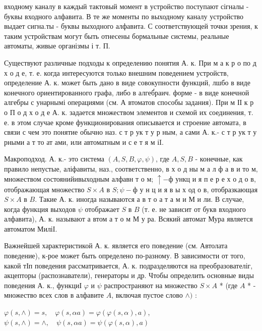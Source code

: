 \documentclass[10pt]{article}
\begin{document}
входному каналу в каждый тактовый момент в устройство поступают сігналы - буквы входного алфавита. В те же моменты по выходному каналу устройство выдает сигна.ты - буквы выходного алфавита. С соответствующей точки зрения, к таким устройствам могут быть отнесены бормальные системы, реальные автоматы, живые організмы і т. П.



Существуют различные подходы к определению понятия А. к. При м а к р о по д х о д е, т. е. когда интересуются только внешним поведением устройств, определение А. к. может быть дано в виде совокупности функций, лшбо в виде конечного ориентированного графа, либо в алгеб́раич. форме - в виде конечной алгебры с унарнымі операциями (см. А втоматов способы задания). При м ІІ к р о П о д х о д е А. к. задается множеством элементов и схемой их соединения, т. е. в этом случае кроме функционирования описывается и строение автомата, в связи с чем это понятие обычно наз. с т р ук т у р ным, а сами А. к.- с т р ук т у рными а т то ат ами, или автоматным и с е т я м іI.



Макроподход. А. к.- это система $(A, S, B, \varphi, \psi)$, где $A, S, B$ - конечные, как правило непустые, аліфавиты, наз., соответственно, в х о д ны м а л ф а в и то м, множеством состоянийивыходным алфавн т о м; $\uparrow-ф$ ункц и я п е р е х о д о в, отображающая множество $S \times A$ в $S ; \psi-ф$ у н ц и я в ы х од о в, отобразкающая $S \times A$ в $B$. Такие А. к. иногда называются а в т о а т а м и М и ли. В случае, когда функция выходов $\psi$ отображает $S$ в $B$ (т. е. не зависит от букв входного алфавита), А. к. называют а втом а т о м М у ра. Всякий автомат Мура является автоматом МиліІ.



Важнейшей характеристикой А. к. является его поведение (см. Автолата поведение), к-рое может быть определено по-разному. В зависимости от того, какой тІп поведения рассматривается, А. к. подразделяются на преобразователіг, акцепторы (распознаватели), генераторы и др. Чтобы определить основные виды поведения А. к., функциІ $\varphi$ и $\psi$ распространяют на множество $S \times A$ * (где $A$ * - множество всех слов в алфавите $A$, включая пустое слово $\wedge)$ :



$\varphi(s, \wedge)=s, \quad \varphi(s, \alpha a)=\varphi(\varphi(s, \alpha), a)$, $\psi(s, \wedge)=\wedge, \quad \psi(s, \alpha a)=\psi(\varphi(s, \alpha), a)$
\end{document}
